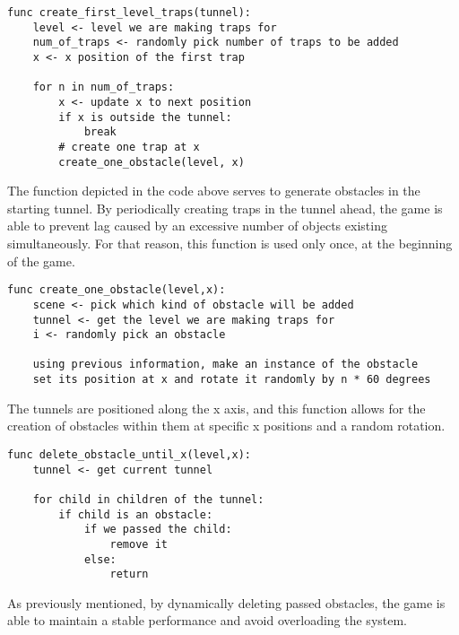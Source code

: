 \begin{verbatim}
func create_first_level_traps(tunnel):
    level <- level we are making traps for
    num_of_traps <- randomly pick number of traps to be added
    x <- x position of the first trap
    
    for n in num_of_traps:
        x <- update x to next position
        if x is outside the tunnel:
            break
        # create one trap at x
        create_one_obstacle(level, x) 
\end{verbatim}

The function depicted in the code above serves to generate obstacles in the starting tunnel. By periodically creating traps in the tunnel ahead, the game is able to prevent lag caused by an excessive number of objects existing simultaneously. For that reason, this function is used only once, at the beginning of the game.

\begin{verbatim} 
func create_one_obstacle(level,x):
    scene <- pick which kind of obstacle will be added
    tunnel <- get the level we are making traps for
    i <- randomly pick an obstacle
    
    using previous information, make an instance of the obstacle
    set its position at x and rotate it randomly by n * 60 degrees  
\end{verbatim}

The tunnels are positioned along the x axis, and this function allows for the creation of obstacles within them at specific x positions and a random rotation.

\begin{verbatim}         
func delete_obstacle_until_x(level,x):
    tunnel <- get current tunnel

    for child in children of the tunnel:
        if child is an obstacle:
            if we passed the child:
                remove it
            else:
                return
\end{verbatim}

As previously mentioned, by dynamically deleting passed obstacles, the game is able to maintain a stable performance and avoid overloading the system.